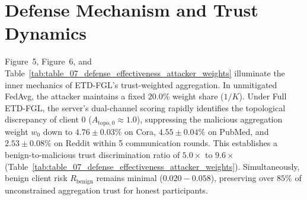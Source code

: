 \section{Defense Mechanism and Trust Dynamics}
\label{sec:defense_mechanism}
Figure~5, Figure~6, and Table~\ref{tab:table_07_defense_effectiveness_attacker_weights} illuminate the inner mechanics of \textsc{ETD-FGL}'s trust-weighted aggregation.
In unmitigated FedAvg, the attacker maintains a fixed $20.0\%$ weight share ($1/K$).
Under Full \textsc{ETD-FGL}, the server's dual-channel scoring rapidly identifies the topological discrepancy of client 0 ($A_{\text{topo},0} \approx 1.0$), suppressing the malicious aggregation weight $w_0$ down to $4.76 \pm 0.03\%$ on Cora, $4.55 \pm 0.04\%$ on PubMed, and $2.53 \pm 0.08\%$ on Reddit within 5 communication rounds.
This establishes a benign-to-malicious trust discrimination ratio of $5.0\times$ to $9.6\times$ (Table~\ref{tab:table_07_defense_effectiveness_attacker_weights}).
Simultaneously, benign client risk $R_{\text{benign}}$ remains minimal ($0.020 - 0.058$), preserving over $85\%$ of unconstrained aggregation trust for honest participants.
